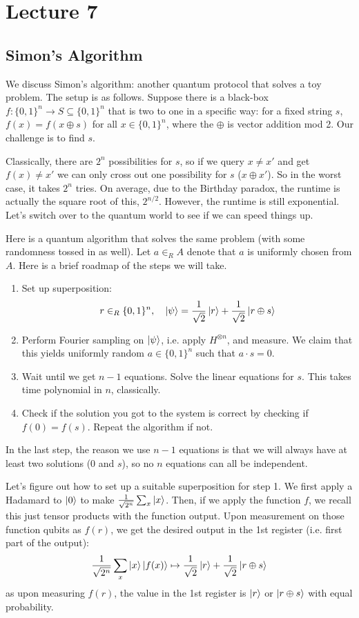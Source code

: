
\section{Lecture 7}

\subsection{Simon's Algorithm}
We discuss Simon's algorithm: another quantum protocol that solves a toy problem. The setup is as follows.
Suppose there is a black-box $f: \{0, 1\}^n \to S \subseteq \{0, 1\}^n$ that is two to one in a specific way: for a fixed string $s$, $f(x) = f(x \oplus s)$ for all $x \in \{0, 1\}^n$,
where the $\oplus$ is vector addition mod 2. Our challenge is to find $s$.

Classically, there are $2^n$ possibilities for $s$, so if we query $x \neq x'$ and get $f(x) \neq x'$ we can only
cross out one possibility for $s$ ($x \oplus x'$). So in the worst case, it takes $2^n$ tries. On average, due to the Birthday paradox,
the runtime is actually the square root of this, $2^{n/2}$. However, the runtime is still exponential. Let's switch over to the quantum world to see if we can speed things up.

Here is a quantum algorithm that solves the same problem (with some randomness tossed in as well). Let $a \in_R A$ denote that $a$ is uniformly chosen
from $A$. Here is a brief roadmap of the steps we will take.
\begin{enumerate}
    \item Set up superposition:
    \[ r \in_R \{0, 1\}^n, \quad \ket{\psi} = \frac{1}{\sqrt{2}} \ket{r} + \frac{1}{\sqrt{2}} \ket{r \oplus s} \]
    \item Perform Fourier sampling on $\ket{\psi}$, i.e. apply $H^{\otimes n}$, and measure. We claim that this yields uniformly random $a \in \{0, 1\}^n$ such that $a \cdot s = 0$.
    \item Wait until we get $n - 1$ equations. Solve the linear equations for $s$. This takes time polynomial in $n$, classically.
    \item Check if the solution you got to the system is correct by checking if $f(0) = f(s)$. Repeat the algorithm if not.
\end{enumerate}
In the last step, the reason we use $n - 1$ equations is that we will always have at least two solutions ($0$ and $s$), so no $n$ equations can all be independent.

Let's figure out how to set up a suitable superposition for step 1. We first apply a Hadamard to $\ket{0}$
to make $\frac{1}{\sqrt{2^n}}\sum_x \ket{x}$. Then, if we apply the function $f$, we recall this just tensor products with the function output. Upon measurement on those function qubits
as $f(r)$, we get the desired output in the 1st register (i.e. first part of the output):
\[ \frac{1}{\sqrt{2^n}} \sum_x \ket{x} \ket{f(x)} \mapsto \frac{1}{\sqrt{2}} \ket{r} + \frac{1}{\sqrt{2}} \ket{r \oplus s}  \]
as upon measuring $f(r)$, the value in the 1st register is $\ket{r}$ or $\ket{r \oplus s}$ with equal probability.


